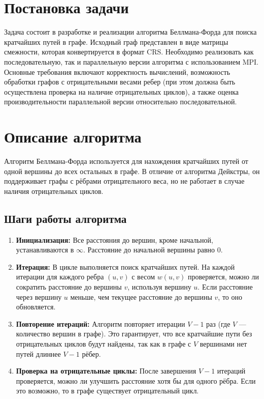 \documentclass[12pt]{article}
\begin{document}
\newpage
\section*{Постановка задачи}

Задача состоит в разработке и реализации алгоритма Беллмана-Форда для поиска кратчайших путей в графе. Исходный граф представлен в виде матрицы смежности, которая конвертируется в формат CRS. Необходимо реализовать как последовательную, так и параллельную версии алгоритма с использованием MPI. Основные требования включают корректность вычислений, возможность обработки графов с отрицательными весами ребер (при этом должна быть осуществлена проверка на наличие отрицательных циклов), а также оценка производительности параллельной версии относительно последовательной.

\newpage
\section*{Описание алгоритма}

Алгоритм Беллмана-Форда используется для нахождения кратчайших путей от одной вершины до всех остальных в графе. В отличие от алгоритма Дейкстры, он поддерживает графы с рёбрами отрицательного веса, но не работает в случае наличия отрицательных циклов.

\subsection{Шаги работы алгоритма} \begin{enumerate}

\item \textbf{Инициализация:}
   Все расстояния до вершин, кроме начальной, устанавливаются в $\infty$. Расстояние до начальной вершины равно 0.

\item \textbf{Итерация:}
   В цикле выполняется поиск кратчайших путей. На каждой итерации для каждого ребра $(u, v)$ с весом $w(u, v)$ проверяется, можно ли сократить расстояние до вершины $v$, используя вершину $u$. Если расстояние через вершину $u$ меньше, чем текущее расстояние до вершины $v$, то оно обновляется.

\item \textbf{Повторение итераций:}
   Алгоритм повторяет итерации $V - 1$ раз (где $V$ — количество вершин в графе). Это гарантирует, что все кратчайшие пути без отрицательных циклов будут найдены, так как в графе с $V$ вершинами нет путей длиннее $V - 1$ рёбер.

\item \textbf{Проверка на отрицательные циклы:}
   После завершения $V - 1$ итераций проверяется, можно ли улучшить расстояние хотя бы для одного рёбра. Если это возможно, то в графе существует отрицательный цикл.
   \end{enumerate}
\end{document}
